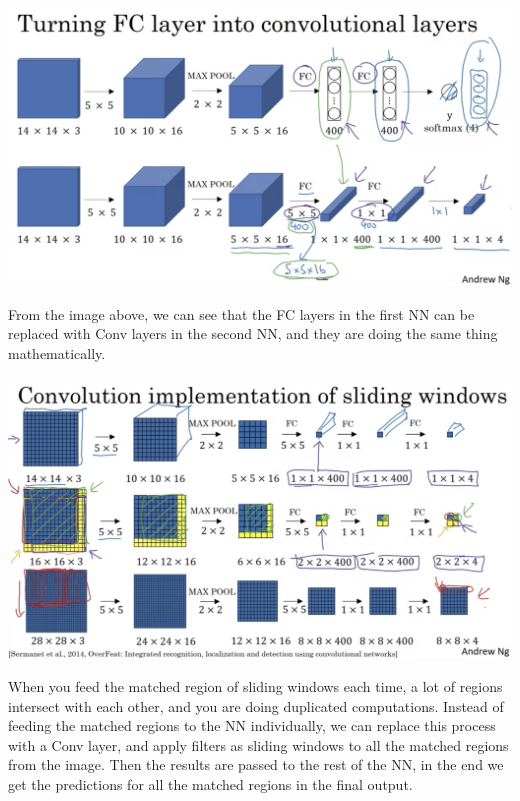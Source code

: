 \documentclass{article}
\begin{document}
\begin{center}
\includegraphics[scale=0.3]{./images/fc_to_conv.png}
\end{center}

\noindent From the image above, we can see that the FC layers in the first NN can be replaced with Conv layers in the second NN, and they are doing the same thing mathematically.

\begin{center}
\includegraphics[scale=0.3]{./images/sliding_windows_conv.png}
\end{center}

\noindent When you feed the matched region of sliding windows each time, a lot of regions intersect with each other, and you are doing duplicated computations. Instead of feeding the matched regions to the NN individually, we can replace this process with a Conv layer, and apply filters as sliding windows to all the matched regions from the image. Then the results are passed to the rest of the NN, in the end we get the predictions for all the matched regions in the final output.

\bigskip
\end{document}
